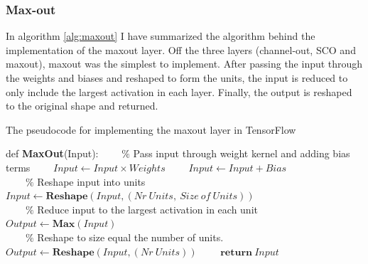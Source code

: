 \subsubsection*{Max-out}
In algorithm \ref{alg:maxout} I have summarized the algorithm behind the implementation of the maxout layer.
Off the three layers (channel-out, \ac{SCO} and maxout), maxout was the simplest to implement. After passing 
the input through the weights and biases and reshaped to form the units, the input is reduced to only include 
the largest activation in each layer. Finally, the output is reshaped to the original shape and returned.
\begin{algorithm}
    \caption{The pseudocode for implementing the maxout layer in TensorFlow}\label{alg:maxout}
    \begin{algorithmic}[1]
    \State def \textbf{MaxOut}(Input): 
    \State \ \ \ \ $\%$ Pass input through weight kernel and adding bias terms
    \State \ \ \ \ $Input \gets Input \times Weights$
    \State \ \ \ \ $Input \gets Input + Bias$
    \\
    \State \ \ \ \ $\%$ Reshape input into units
    \State \ \ \ \ $Input \gets \textbf{Reshape}(Input,(Nr\ Units,\ Size \ of \ Units))$
    \\
    \State \ \ \ \ $\%$ Reduce input to the largest activation in each unit
    \State \ \ \ \ $Output \gets \textbf{Max}(Input)$
    \\
    \State \ \ \ \ $\%$ Reshape to size equal the number of units.
    \State \ \ \ \ $Output \gets \textbf{Reshape}(Input,(Nr \ Units))$
    \State \ \ \ \ $\textbf{return}\ Input$
    \end{algorithmic}
\end{algorithm}
